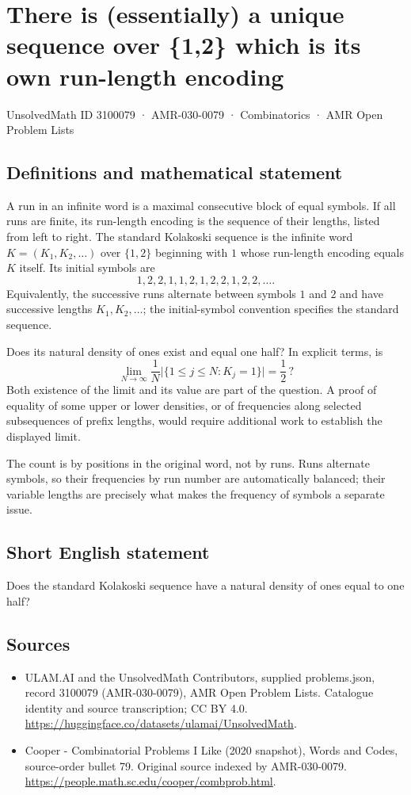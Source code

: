 \documentclass[11pt,a4paper]{article}
\begin{document}
\section*{There is (essentially) a unique sequence over \{1,2\} which is its own run-length encoding}\label{3100079}
{\small UnsolvedMath ID 3100079 · AMR-030-0079 · Combinatorics · AMR Open Problem Lists}
\subsection{Definitions and mathematical statement}
A run in an infinite word is a maximal consecutive block of
equal symbols. If all runs are finite, its run-length encoding
is the sequence of their lengths, listed from left to right.
The standard Kolakoski sequence is the infinite word
$K=(K_1,K_2,\ldots)$ over $\{1,2\}$ beginning with $1$ whose
run-length encoding equals $K$ itself. Its initial symbols are
\[
                 1,2,2,1,1,2,1,2,2,1,2,2,\ldots.
\]
Equivalently, the successive runs alternate between symbols
$1$ and $2$ and have successive lengths $K_1,K_2,\ldots$;
the initial-symbol convention specifies the standard sequence.

Does its natural density of ones exist and equal one half?
In explicit terms, is
\[
           \lim_{N\to\infty}\frac1N
                  \bigl|\{1\le j\le N:K_j=1\}\bigr|=\frac12\,?
\]
Both existence of the limit and its value are part of the
question. A proof of equality of some upper or lower densities,
or of frequencies along selected subsequences of prefix lengths,
would require additional work to establish the displayed limit.

The count is by positions in the original word, not by runs.
Runs alternate symbols, so their frequencies by run number are
automatically balanced; their variable lengths are precisely
what makes the frequency of symbols a separate issue.
\subsection{Short English statement}
Does the standard Kolakoski sequence have a natural density of ones equal to one half?
\subsection{Sources}
\begin{itemize}
\item[S1] ULAM.AI and the UnsolvedMath Contributors, supplied problems.json, record 3100079 (AMR-030-0079), AMR Open Problem Lists. Catalogue identity and source transcription; CC BY 4.0.
\url{https://huggingface.co/datasets/ulamai/UnsolvedMath}.
\item[S2] Cooper - Combinatorial Problems I Like (2020 snapshot), Words and Codes, source-order bullet 79. Original source indexed by AMR-030-0079.
\url{https://people.math.sc.edu/cooper/combprob.html}.
\end{itemize}
\end{document}
